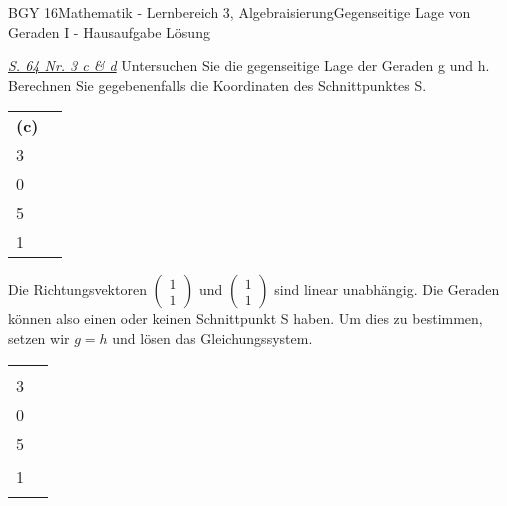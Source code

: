 \documentclass[oneside,openany,headings=optiontotoc,11pt,numbers=noenddot]{scrreprt}
\begin{document}
\begin{worksheet}{BGY 16}{Mathematik - Lernbereich 3, Algebraisierung}{Gegenseitige Lage von Geraden I - Hausaufgabe Lösung}
		\begin{framed}
			\noindent
			\underline{\textit{S. 64 Nr. 3 c \& d}} Untersuchen Sie die gegenseitige Lage der Geraden g und h. Berechnen Sie gegebenenfalls die Koordinaten des Schnittpunktes S.\\
			\par\noindent
			\begin{tabularx}{\textwidth}{XX}
				\textbf{(c)} \(g: \vec{x} = \left(\begin{array}{c}7\\3\end{array}\right) + r\left(\begin{array}{c}1\\0\end{array}\right)\) & \(h: \vec{x} = \left(\begin{array}{c}2\\5\end{array}\right) + t\left(\begin{array}{c}1\\1\end{array}\right)\)
			\end{tabularx}
			Die Richtungsvektoren \(\left(\begin{array}{c}1\\1\end{array}\right)\) und \(\left(\begin{array}{c}1\\1\end{array}\right)\) sind \color{blue}linear unabhängig\normalcolor. Die Geraden können also \color{red}einen\normalcolor{} oder \color{codegreen}keinen\normalcolor{} Schnittpunkt S haben. Um dies zu bestimmen, setzen wir \(g=h\) und lösen das Gleichungssystem.\\
			\par\noindent
			\begin{tabularx}{\textwidth}{X|X}
				\(\left(\begin{array}{c}7\\3\end{array}\right) + r\left(\begin{array}{c}1\\0\end{array}\right) = \left(\begin{array}{c}2\\5\end{array}\right) + t\left(\begin{array}{c}1\\1\end{array}\right)\) & \begin{tabular}{lll}

\end{tabular}
\end{tabularx}
\end{framed}
\end{worksheet}
\end{document}
